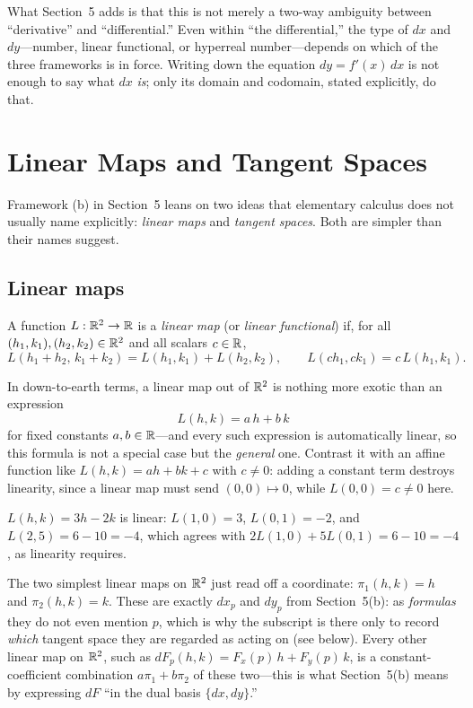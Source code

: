 \documentclass{essay}
\begin{document}
What Section~5 adds is that this is not merely a two-way ambiguity between ``derivative'' and ``differential.'' Even within ``the differential,'' the type of \(dx\) and \(dy\)---number, linear functional, or hyperreal number---depends on which of the three frameworks is in force. Writing down the equation \(dy = f'(x)\,dx\) is not enough to say what \(dx\) \emph{is}; only its domain and codomain, stated explicitly, do that.

\appendix

\section{Linear Maps and Tangent Spaces}
\label{app:background}

Framework (b) in Section~5 leans on two ideas that elementary calculus does not usually name explicitly: \emph{linear maps} and \emph{tangent spaces}. Both are simpler than their names suggest.

\subsection*{Linear maps}

\begin{definition}
  A function \(L : \mathbb{R}^{2} \to \mathbb{R}\) is a \emph{linear map} (or \emph{linear functional}) if, for all \((h_{1},k_{1}), (h_{2},k_{2}) \in \mathbb{R}^{2}\) and all scalars \(c \in \mathbb{R}\),
  \[ L(h_{1}+h_{2},\,k_{1}+k_{2}) = L(h_{1},k_{1}) + L(h_{2},k_{2}), \qquad L(ch_{1},ck_{1}) = c\,L(h_{1},k_{1}). \]
\end{definition}

In down-to-earth terms, a linear map out of \(\mathbb{R}^{2}\) is nothing more exotic than an expression
\[ L(h,k) = a\,h + b\,k \]
for fixed constants \(a, b \in \mathbb{R}\)---and every such expression is automatically linear, so this formula is not a special case but the \emph{general} one. Contrast it with an affine function like \(L(h,k) = ah+bk+c\) with \(c \ne 0\): adding a constant term destroys linearity, since a linear map must send \((0,0) \mapsto 0\), while \(L(0,0) = c \ne 0\) here.

\begin{example}
  \(L(h,k) = 3h - 2k\) is linear: \(L(1,0)=3\), \(L(0,1)=-2\), and \(L(2,5) = 6-10=-4\), which agrees with \(2L(1,0)+5L(0,1) = 6-10=-4\), as linearity requires.
\end{example}

The two simplest linear maps on \(\mathbb{R}^{2}\) just read off a coordinate: \(\pi_{1}(h,k)=h\) and \(\pi_{2}(h,k)=k\). These are exactly \(dx_{p}\) and \(dy_{p}\) from Section~5(b): as \emph{formulas} they do not even mention \(p\), which is why the subscript is there only to record \emph{which} tangent space they are regarded as acting on (see below). Every other linear map on \(\mathbb{R}^{2}\), such as \(dF_{p}(h,k) = F_{x}(p)\,h+F_{y}(p)\,k\), is a constant-coefficient combination \(a\pi_{1}+b\pi_{2}\) of these two---this is what Section~5(b) means by expressing \(dF\) ``in the dual basis \(\{dx,dy\}\).''
\end{document}
